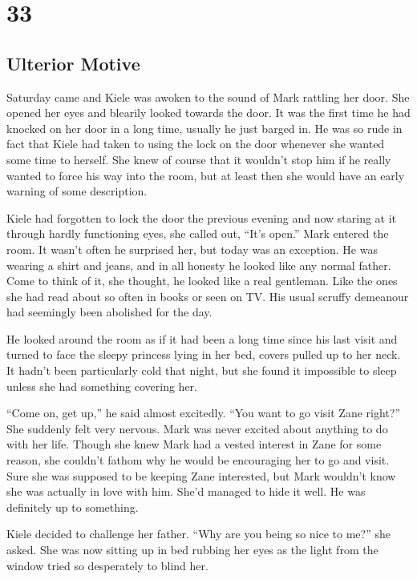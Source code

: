 \chapter{33}
\section{Ulterior Motive}


Saturday came and Kiele was awoken to the sound of Mark rattling her door.  She opened her eyes and blearily looked towards the door.  It was the first time he had knocked on her door in a long time, usually he just barged in.  He was so rude in fact that Kiele had taken to using the lock on the door whenever she wanted some time to herself.  She knew of course that it wouldn't stop him if he really wanted to force his way into the room, but at least then she would have an early warning of some description.

Kiele had forgotten to lock the door the previous evening and now staring at it through hardly functioning eyes, she called out, ``It's open.''  Mark entered the room.  It wasn't often he surprised her, but today was an exception.  He was wearing a shirt and jeans, and in all honesty he looked like any normal father.  Come to think of it, she thought, he looked like a real gentleman.  Like the ones she had read about so often in books or seen on TV.  His usual scruffy demeanour had seemingly been abolished for the day.   

He looked around the room as if it had been a long time since his last visit and turned to face the sleepy princess lying in her bed, covers pulled up to her neck.  It hadn't been particularly cold that night, but she found it impossible to sleep unless she had something covering her.  

``Come on, get up,'' he said almost excitedly.  ``You want to go visit Zane right?''  She suddenly felt very nervous.  Mark was never excited about anything to do with her life.  Though she knew Mark had a vested interest in Zane for some reason, she couldn't fathom why he would be encouraging her to go and visit.  Sure she was supposed to be keeping Zane interested, but Mark wouldn't know she was actually in love with him.  She'd managed to hide it well.  He was definitely up to something.  

Kiele decided to challenge her father.  ``Why are you being so nice to me?'' she asked.  She was now sitting up in bed rubbing her eyes as the light from the window tried so desperately to blind her.

